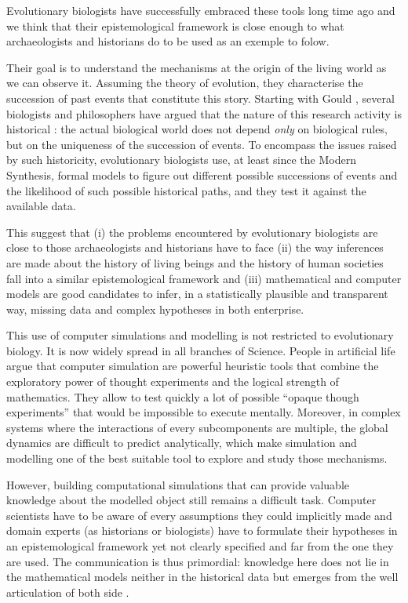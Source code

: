 \documentclass[a4paper]{article}
\begin{document}
Evolutionary biologists have successfully embraced these tools long time ago and we think that their epistemological framework is close enough to what archaeologists and historians do to be used as an exemple to folow. 

Their goal is to understand the mechanisms at the origin of the living world as we can observe it. Assuming the theory of evolution, they characterise the succession of past events that constitute this story. Starting with Gould \cite{gould1989wonderfullife}, several biologists and philosophers have argued that the nature of this research activity is historical \cite{beatty1995evolutionary}: the actual biological world does not depend \emph{only} on biological rules, but on the uniqueness of the succession of events. To encompass the issues raised by such historicity, evolutionary biologists use, at least since the Modern Synthesis, formal models to figure out different possible successions of events and the likelihood of such possible historical paths, and they test it against the available data.

This suggest that (i) the problems encountered by evolutionary biologists are close to those archaeologists and historians have to face (ii) the way inferences are made about the history of living beings and the history of human societies fall into a similar epistemological framework and (iii) mathematical and computer models are good candidates to infer, in a statistically plausible and transparent way, missing data and complex hypotheses in both enterprise.

This use of computer simulations and modelling is not restricted to evolutionary biology. It is now widely spread in all branches of Science. People in artificial life \cite{paolo00simulationmodelsasopaquethoughtexperiments} argue that computer simulation are powerful heuristic tools that combine the exploratory power of thought experiments and the logical strength of mathematics. They allow to test quickly a lot of possible ``opaque though experiments'' that would be impossible to execute mentally. Moreover, in complex systems where the interactions of every subcomponents are multiple, the global dynamics are difficult to predict analytically, which make simulation and modelling one of the best suitable tool to explore and study those mechanisms.

However, building computational simulations that can provide valuable knowledge about the modelled object still remains a difficult task. Computer scientists have to be aware of every assumptions they could implicitly made and domain experts (as historians or biologists) have to formulate their hypotheses in an epistemological framework yet not clearly specified and far from the one they are used. The communication is thus primordial: knowledge here does not lie in the mathematical models neither in the historical data but emerges from the well articulation of both side \cite{winsberg09taletwomethods}.
\end{document}
